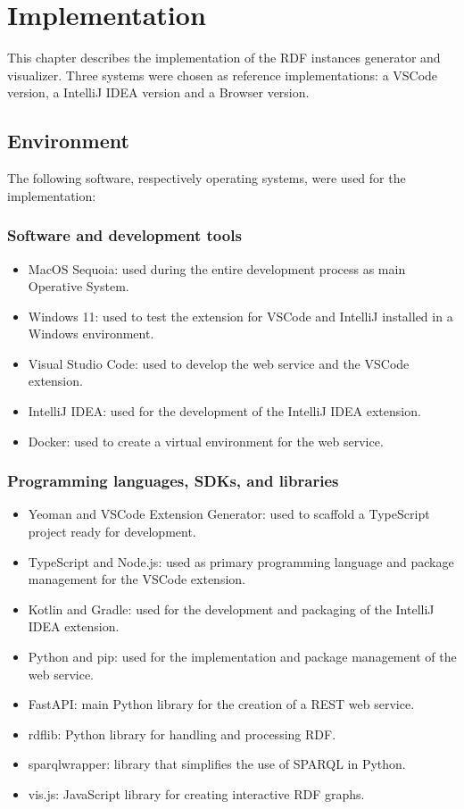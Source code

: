 \chapter{Implementation\label{cha:chapter4}}

This chapter describes the implementation of the RDF instances generator and visualizer. 
Three systems were chosen as reference implementations: a VSCode version, a IntelliJ IDEA version and a Browser version. 
\section{Environment\label{sec:env}}
The following software, respectively operating systems, were used for the implementation:

\subsection{Software and development tools\label{sec:os}}

\begin{itemize}
  \item MacOS Sequoia: used during the entire development process as main Operative System.
  \item Windows 11: used to test the extension for VSCode and IntelliJ installed in a Windows environment.
  \item Visual Studio Code: used to develop the web service and the VSCode extension.
  \item IntelliJ IDEA: used for the development of the IntelliJ IDEA extension.
  \item Docker: used to create a virtual environment for the web service.
  \end{itemize}

\subsection{Programming languages, SDKs, and libraries\label{sec:proglang}}

\begin{itemize}
    \item Yeoman and VSCode Extension Generator: used to scaffold a TypeScript project ready for development.
		\item TypeScript and Node.js: used as primary programming language and package management for the VSCode extension.
		\item Kotlin and Gradle: used for the development and packaging of the IntelliJ IDEA extension.
		\item Python and pip: used for the implementation and package management of the web service.
		\item FastAPI: main Python library for the creation of a REST web service.
		\item rdflib: Python library for handling and processing RDF.
		\item sparqlwrapper: library that simplifies the use of SPARQL in Python. 
		\item vis.js: JavaScript library for creating interactive RDF graphs.
\end{itemize}

